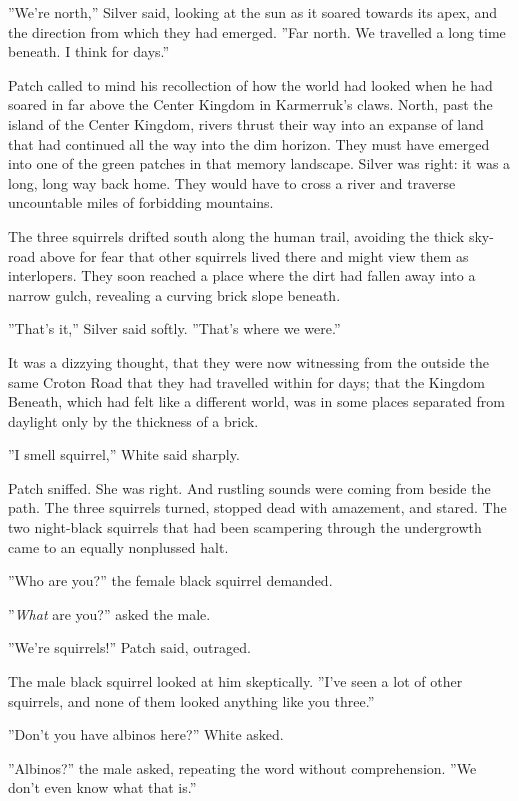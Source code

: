 \documentclass[12pt]{book}
\begin{document}
''We're north,'' Silver said, looking at the sun as it soared towards
its apex, and the direction from which they had emerged. ''Far
north. We travelled a long time beneath. I think for days.''

Patch called to mind his recollection of how the world had looked when
he had soared in far above the Center Kingdom in Karmerruk's
claws. North, past the island of the Center Kingdom, rivers thrust
their way into an expanse of land that had continued all the way into
the dim horizon. They must have emerged into one of the green patches
in that memory landscape. Silver was right: it was a long, long way
back home. They would have to cross a river and traverse uncountable
miles of forbidding mountains.

The three squirrels drifted south along the human trail, avoiding the
thick sky-road above for fear that other squirrels lived there and
might view them as interlopers. They soon reached a place where the
dirt had fallen away into a narrow gulch, revealing a curving brick
slope beneath.

''That's it,'' Silver said softly. ''That's where we were.''

It was a dizzying thought, that they were now witnessing from the
outside the same Croton Road that they had travelled within for days;
that the Kingdom Beneath, which had felt like a different world, was
in some places separated from daylight only by the thickness of a
brick.

''I smell squirrel,'' White said sharply.

Patch sniffed. She was right. And rustling sounds were coming from
beside the path. The three squirrels turned, stopped dead with
amazement, and stared. The two night-black squirrels that had been
scampering through the undergrowth came to an equally nonplussed halt.

''Who are you?'' the female black squirrel demanded.

''\textit{What} are you?'' asked the male.

''We're squirrels!'' Patch said, outraged.

The male black squirrel looked at him skeptically. ''I've seen a lot
of other squirrels, and none of them looked anything like you three.''

''Don't you have albinos here?'' White asked.

''Albinos?'' the male asked, repeating the word without
comprehension. ''We don't even know what that is.''
\end{document}
